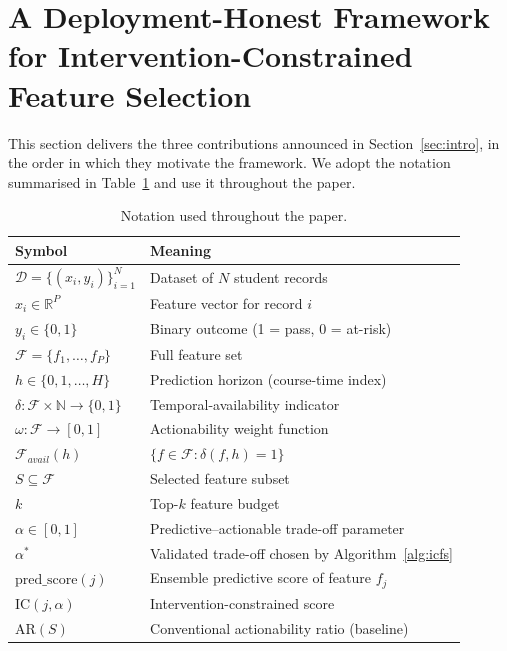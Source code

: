 \documentclass[a4paper,fleqn]{cas-sc}
\begin{document}
\section{A Deployment-Honest Framework for Intervention-Constrained Feature Selection}
\label{sec:methodology}

This section delivers the three contributions announced in Section~\ref{sec:intro}, in the order in which they motivate the framework. We adopt the notation summarised in Table~\ref{tab:notation} and use it throughout the paper.

\begin{table}[htbp]
\caption{Notation used throughout the paper.}
\label{tab:notation}
\centering
\renewcommand{\arraystretch}{1.18}
\begin{tabular}{ll}
\toprule
\textbf{Symbol} & \textbf{Meaning} \\
\midrule
$\mathcal{D} = \{(x_i, y_i)\}_{i=1}^{N}$ & Dataset of $N$ student records \\
$x_i \in \mathbb{R}^P$              & Feature vector for record $i$ \\
$y_i \in \{0, 1\}$                  & Binary outcome (1 = pass, 0 = at-risk) \\
$\mathcal{F} = \{f_1, \ldots, f_P\}$ & Full feature set \\
$h \in \{0, 1, \ldots, H\}$         & Prediction horizon (course-time index) \\
$\delta : \mathcal{F} \times \mathbb{N} \to \{0,1\}$ &
  Temporal-availability indicator \\
$\omega : \mathcal{F} \to [0, 1]$   & Actionability weight function \\
$\mathcal{F}_{avail}(h)$            & $\{f \in \mathcal{F} : \delta(f, h) = 1\}$ \\
$S \subseteq \mathcal{F}$           & Selected feature subset \\
$k$                                 & Top-$k$ feature budget \\
$\alpha \in [0, 1]$                 & Predictive--actionable trade-off parameter \\
$\alpha^*$                          & Validated trade-off chosen by Algorithm~\ref{alg:icfs} \\
$\mathrm{pred\_score}(j)$           & Ensemble predictive score of feature $f_j$ \\
$\mathrm{IC}(j, \alpha)$            & Intervention-constrained score \\
$\mathrm{AR}(S)$                    & Conventional actionability ratio (baseline) \\

\end{tabular}
\end{table}
\end{document}
